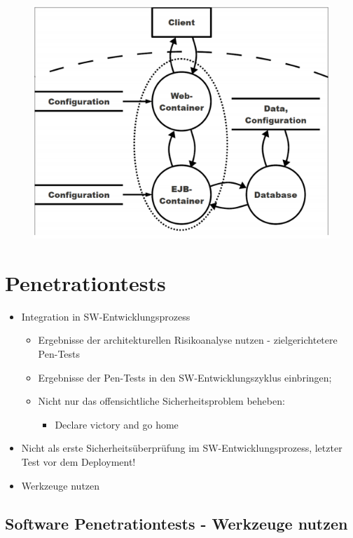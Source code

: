 \documentclass[openany]{book}
\begin{document}
\begin{figure}[h!]
    \centering
    \includegraphics[width=0.65\linewidth]{Pics/ARA.PNG}
\end{figure}

\section{Penetrationtests}

\begin{itemize}
    \item Integration in SW-Entwicklungsprozess
    \begin{itemize}
        \item Ergebnisse der architekturellen Risikoanalyse nutzen - zielgerichtetere Pen-Tests
        \item Ergebnisse der Pen-Tests in den SW-Entwicklungszyklus einbringen;
        \item Nicht nur das offensichtliche Sicherheitsproblem beheben:
        \begin{itemize}
            \item Declare victory and go home
        \end{itemize}
    \end{itemize}
    \item Nicht als erste Sicherheitsüberprüfung im SW-Entwicklungsprozess, letzter Test vor dem Deployment!
    \item Werkzeuge nutzen
\end{itemize}

\subsection{Software Penetrationtests - Werkzeuge nutzen}
\end{document}
